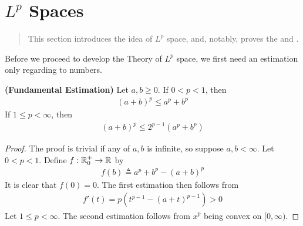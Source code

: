 \documentclass{report}
\begin{document}
\section{$L^p$ Spaces}
\begin{abstract}
This section introduces the idea of $L^p$ space, and, notably, proves the  and .  
\end{abstract}
\begin{mdframed}
Before we proceed to develop the Theory of $L^p$ space, we first need an estimation only regarding to numbers. 
\end{mdframed}
\begin{theorem}
\textbf{(Fundamental Estimation)} Let $a,b\geq 0$. If $0<p<1$, then 
 \begin{align*}
   (a+b)^p \leq a^p + b^p
 \end{align*}
If $1\leq p <\infty$, then 
\begin{align*}
  (a+b)^p \leq 2^{p-1}(a^p+b^p)
\end{align*}
\end{theorem}
\begin{proof}
The proof is trivial if any of $a,b$ is infinite, so suppose  $a,b< \infty$. Let $0<p<1$. Define $f:\mathbb{R}_0^+\rightarrow \mathbb{R}$ by 
\begin{align*}
f(b)\triangleq a^p + b^p - (a+b)^p
\end{align*}
It is clear that  $f(0)=0$. The first estimation then follows from 
\begin{align*}
f'(t)= p(t^{p-1}-(a+t)^{p-1})> 0
\end{align*}
Let $1\leq p<\infty$. The second estimation follows from $x^p$ being convex on  $[0,\infty)$. 
\end{proof}
\end{document}
